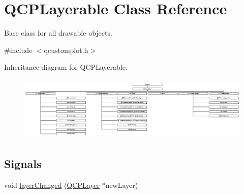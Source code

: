 \hypertarget{class_q_c_p_layerable}{}\section{Q\+C\+P\+Layerable Class Reference}
\label{class_q_c_p_layerable}


Base class for all drawable objects.  




{\ttfamily \#include $<$qcustomplot.\+h$>$}

Inheritance diagram for Q\+C\+P\+Layerable\+:\begin{figure}[H]
\begin{center}
\leavevmode
\includegraphics[height=3.106796cm]{d6/d4d/class_q_c_p_layerable}
\end{center}
\end{figure}
\subsection*{Signals}
\begin{DoxyCompactItemize}
\item 
void \mbox{\hyperlink{class_q_c_p_layerable_abbf8657cedea73ac1c3499b521c90eba}{layer\+Changed}} (\mbox{\hyperlink{class_q_c_p_layer}{Q\+C\+P\+Layer}} $\ast$new\+Layer)
\end{DoxyCompactItemize}
